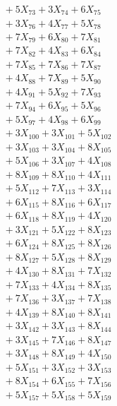 \documentclass[a4paper,10pt]{article}
\begin{document}
{\begin{align}
&\;  + 5 X_{73} + 3 X_{74} + 6 X_{75} \\[0.3ex]
&\;  + 3 X_{76} + 4 X_{77} + 5 X_{78} \\[0.3ex]
&\;  + 7 X_{79} + 6 X_{80} + 7 X_{81} \\[0.3ex]
&\;  + 7 X_{82} + 4 X_{83} + 6 X_{84} \\[0.3ex]
&\;  + 7 X_{85} + 7 X_{86} + 7 X_{87} \\[0.3ex]
&\;  + 4 X_{88} + 7 X_{89} + 5 X_{90} \\[0.3ex]
&\;  + 4 X_{91} + 5 X_{92} + 7 X_{93} \\[0.3ex]
&\;  + 7 X_{94} + 6 X_{95} + 5 X_{96} \\[0.3ex]
&\;  + 5 X_{97} + 4 X_{98} + 6 X_{99} \\[0.5ex]\allowbreak
&\;  + 3 X_{100} + 3 X_{101} + 5 X_{102} \\[0.3ex]
&\;  + 3 X_{103} + 3 X_{104} + 8 X_{105} \\[0.3ex]
&\;  + 5 X_{106} + 3 X_{107} + 4 X_{108} \\[0.3ex]
&\;  + 8 X_{109} + 8 X_{110} + 4 X_{111} \\[0.3ex]
&\;  + 5 X_{112} + 7 X_{113} + 3 X_{114} \\[0.3ex]
&\;  + 6 X_{115} + 8 X_{116} + 6 X_{117} \\[0.3ex]
&\;  + 6 X_{118} + 8 X_{119} + 4 X_{120} \\[0.3ex]
&\;  + 3 X_{121} + 5 X_{122} + 8 X_{123} \\[0.3ex]
&\;  + 6 X_{124} + 8 X_{125} + 8 X_{126} \\[0.3ex]
&\;  + 8 X_{127} + 5 X_{128} + 8 X_{129} \\[0.5ex]\allowbreak
&\;  + 4 X_{130} + 8 X_{131} + 7 X_{132} \\[0.3ex]
&\;  + 7 X_{133} + 4 X_{134} + 8 X_{135} \\[0.3ex]
&\;  + 7 X_{136} + 3 X_{137} + 7 X_{138} \\[0.3ex]
&\;  + 4 X_{139} + 8 X_{140} + 8 X_{141} \\[0.3ex]
&\;  + 3 X_{142} + 3 X_{143} + 8 X_{144} \\[0.3ex]
&\;  + 3 X_{145} + 7 X_{146} + 8 X_{147} \\[0.3ex]
&\;  + 3 X_{148} + 8 X_{149} + 4 X_{150} \\[0.3ex]
&\;  + 5 X_{151} + 3 X_{152} + 3 X_{153} \\[0.3ex]
&\;  + 8 X_{154} + 6 X_{155} + 7 X_{156} \\[0.3ex]
&\;  + 5 X_{157} + 5 X_{158} + 5 X_{159} \\[0.5ex]\allowbreak

\end{align}}
\end{document}
